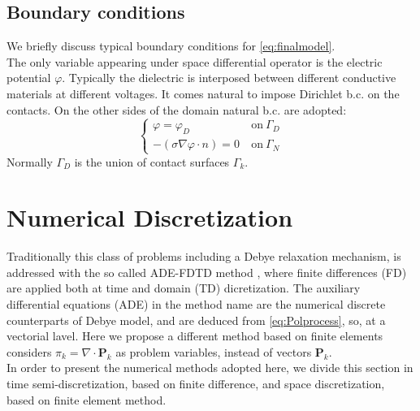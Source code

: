 \documentclass[11pt,a4paper]{article}
\begin{document}
\subsection{Boundary conditions}
We briefly discuss typical boundary conditions for \eqref{eq:finalmodel}.\\
The only variable appearing under space differential operator is the electric potential \(\varphi\). Typically the dielectric is interposed between different conductive materials at different voltages. It comes natural to impose Dirichlet b.c. on the contacts. On the other sides of the domain natural b.c. are adopted:
\begin{equation}\label{eq:LEVEL1Bc}
	\left\{\begin{aligned}
		\left.\varphi\right. = \varphi_D\ &\ \mathrm{on}\ \Gamma_D\\[3mm]
		-\left.\left(\sigma \nabla  \varphi \cdot n\right) = 0\right. &\ \mathrm{on}\ \Gamma_N
	\end{aligned}\right.
\end{equation}
Normally \(\Gamma_D\) is the union of contact surfaces \(\Gamma_k\).

\section{Numerical Discretization}
Traditionally this class of problems including a Debye relaxation mechanism, is addressed with the so called ADE-FDTD method \cite{taflove}, where finite differences (FD) are applied both at time and domain (TD) dicretization. The auxiliary differential equations (ADE) in the method name are the numerical discrete counterparts of Debye model, and are deduced from \eqref{eq:Polprocess}, so, at a vectorial lavel. Here we propose a different method based on finite elements considers \(\pi_k = \nabla \cdot \mathbf{P}_k\) as problem variables, instead of vectors \(\mathbf{P}_k\).\\
In order to present the numerical methods adopted here, we divide this section in time semi-discretization, based on finite difference, and space discretization, based on finite element method. 
\end{document}
